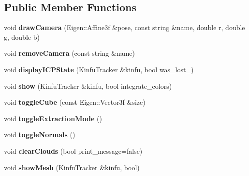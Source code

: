 \subsection*{Public Member Functions}
\begin{DoxyCompactItemize}
\item 
\hypertarget{struct_scene_cloud_view_a7cd6f6839d610c4653847b3b1c34880c}{void {\bfseries draw\+Camera} (Eigen\+::\+Affine3f \&pose, const string \&name, double r, double g, double b)}\label{struct_scene_cloud_view_a7cd6f6839d610c4653847b3b1c34880c}

\item 
\hypertarget{struct_scene_cloud_view_aa62c8ada85b5cb6888f5826d20c1bce7}{void {\bfseries remove\+Camera} (const string \&name)}\label{struct_scene_cloud_view_aa62c8ada85b5cb6888f5826d20c1bce7}

\item 
\hypertarget{struct_scene_cloud_view_aa13f0f30c1f98c7996c73be747716603}{void {\bfseries display\+I\+C\+P\+State} (Kinfu\+Tracker \&kinfu, bool was\+\_\+lost\+\_\+)}\label{struct_scene_cloud_view_aa13f0f30c1f98c7996c73be747716603}

\item 
\hypertarget{struct_scene_cloud_view_abf6b5dc76d3dd5b749f4678a396a1dcb}{void {\bfseries show} (Kinfu\+Tracker \&kinfu, bool integrate\+\_\+colors)}\label{struct_scene_cloud_view_abf6b5dc76d3dd5b749f4678a396a1dcb}

\item 
\hypertarget{struct_scene_cloud_view_ad1643724f930b5ad0e1421c9315be25b}{void {\bfseries toggle\+Cube} (const Eigen\+::\+Vector3f \&size)}\label{struct_scene_cloud_view_ad1643724f930b5ad0e1421c9315be25b}

\item 
\hypertarget{struct_scene_cloud_view_af9ba10707d975a4217188fe27f4674c7}{void {\bfseries toggle\+Extraction\+Mode} ()}\label{struct_scene_cloud_view_af9ba10707d975a4217188fe27f4674c7}

\item 
\hypertarget{struct_scene_cloud_view_a4a905792b1bc9fbce3f7cffe68e6acad}{void {\bfseries toggle\+Normals} ()}\label{struct_scene_cloud_view_a4a905792b1bc9fbce3f7cffe68e6acad}

\item 
\hypertarget{struct_scene_cloud_view_aa424f942a142f1c0523529cf936ca6c8}{void {\bfseries clear\+Clouds} (bool print\+\_\+message=false)}\label{struct_scene_cloud_view_aa424f942a142f1c0523529cf936ca6c8}

\item 
\hypertarget{struct_scene_cloud_view_ac898c36f22b4ab497377682305cd99e4}{void {\bfseries show\+Mesh} (Kinfu\+Tracker \&kinfu, bool)}\label{struct_scene_cloud_view_ac898c36f22b4ab497377682305cd99e4}

\end{DoxyCompactItemize}
